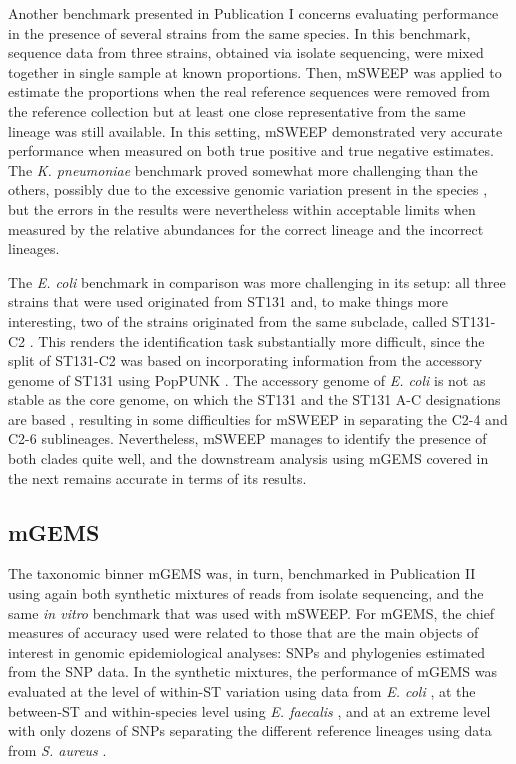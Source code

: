 \documentclass[officiallayout]{tktla}
\begin{document}
Another benchmark presented in Publication I concerns evaluating
performance in the presence of several strains from the same
species. In this benchmark, sequence data from three strains, obtained
via isolate sequencing, were mixed together in single sample at known
proportions. Then, mSWEEP was applied to estimate the proportions when
the real reference sequences were removed from the reference
collection but at least one close representative from the same lineage
was still available. In this setting, mSWEEP demonstrated very
accurate performance when measured on both true positive and true
negative estimates. The \textit{K. pneumoniae} benchmark proved
somewhat more challenging than the others, possibly due to the
excessive genomic variation present in the species
\citep{wyres2016klebsiella}, but the errors in the results were
nevertheless within acceptable limits when measured by the relative
abundances for the correct lineage and the incorrect lineages.

The \textit{E. coli} benchmark in comparison was more challenging in
its setup: all three strains that were used originated from ST131 and,
to make things more interesting, two of the strains originated from
the same subclade, called ST131-C2
\citep{kallonen2017systematic}. This renders the identification task
substantially more difficult, since the split of ST131-C2 was based on
incorporating information from the accessory genome of ST131 using
PopPUNK \citep{lees2019fast}. The accessory genome of \textit{E. coli}
is not as stable as the core genome, on which the
ST131 and the ST131 A-C designations are based \citep{kallonen2017systematic},
resulting in some difficulties for mSWEEP in separating the C2-4 and
C2-6 sublineages. Nevertheless, mSWEEP manages to identify the
presence of both clades quite well, and the downstream analysis using
mGEMS covered in the next remains accurate in terms of its results.

\subsection{mGEMS}
\label{mgems-performance-benchmark}

The taxonomic binner mGEMS was, in turn, benchmarked in Publication II
using again both synthetic mixtures of reads from isolate sequencing,
and the same \textit{in vitro} benchmark that was used with
mSWEEP. For mGEMS, the chief measures of accuracy used were related to
those that are the main objects of interest in genomic epidemiological
analyses: SNPs and phylogenies estimated from the SNP data. In the
synthetic mixtures, the performance of mGEMS was evaluated at the
level of within-ST variation using data from \textit{E. coli}
\citep{brodrick2017longitudinal}, at the between-ST and within-species
level using \textit{E. faecalis} \citep{raven2016genome}, and at an
extreme level with only dozens of SNPs separating the different
reference lineages using data from \textit{S. aureus}
\citep{paterson2015capturing}.
\end{document}
